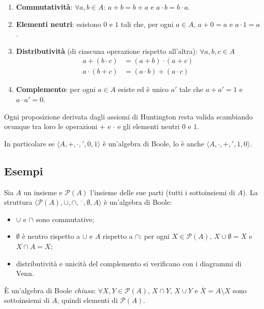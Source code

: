 \documentclass[11pt,a4paper]{article}
\begin{document}
\begin{enumerate}
    \item \textbf{Commutatività}: $\forall a, b \in A$:
          $a + b = b + a$ \quad e \quad $a \cdot b = b \cdot a$.
    \item \textbf{Elementi neutri}: esistono $0$ e $1$ tali che, per ogni
          $a \in A$, $a + 0 = a$ e $a \cdot 1 = a$.
    \item \textbf{Distributività} (di ciascuna operazione rispetto all'altra):
          $\forall a, b, c \in A$
          \begin{align*}
            a + (b \cdot c) &= (a + b) \cdot (a + c)\\
            a \cdot (b + c) &= (a \cdot b) + (a \cdot c)
          \end{align*}
    \item \textbf{Complemento}: per ogni $a \in A$ esiste ed è unico $a'$ tale
          che $a + a' = 1$ e $a \cdot a' = 0$.
\end{enumerate}

\begin{teorema}
Ogni proposizione derivata dagli assiomi di Huntington resta valida scambiando
ovunque tra loro le operazioni $+$ e $\cdot$ e gli elementi neutri $0$ e $1$.
\end{teorema}

\begin{osservazione}
In particolare se $\langle A, +, \cdot, ', 0, 1 \rangle$ è un'algebra di Boole,
lo è anche $\langle A, \cdot, +, ', 1, 0 \rangle$.
\end{osservazione}

\subsection{Esempi}

\begin{esempio}
Sia $A$ un insieme e $\mathcal{P}(A)$ l'insieme delle sue parti (tutti i
sottoinsiemi di $A$). La struttura
$\langle \mathcal{P}(A), \cup, \cap, \overline{\phantom{x}}, \emptyset, A \rangle$
è un'algebra di Boole:
\begin{itemize}
    \item $\cup$ e $\cap$ sono commutative;
    \item $\emptyset$ è neutro rispetto a $\cup$ e $A$ rispetto a $\cap$:
          per ogni $X \in \mathcal{P}(A)$, $X \cup \emptyset = X$ e
          $X \cap A = X$;
    \item distributività e unicità del complemento si verificano con i
          diagrammi di Venn.
\end{itemize}
È un'algebra di Boole \emph{chiusa}: $\forall X, Y \in \mathcal{P}(A)$,
$X \cap Y$, $X \cup Y$ e $\overline{X} = A \setminus X$ sono sottoinsiemi di $A$,
quindi elementi di $\mathcal{P}(A)$.
\end{esempio}
\end{document}
